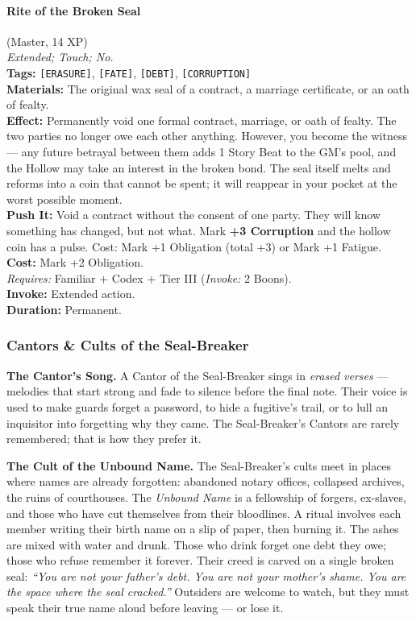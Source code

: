 \paragraph{Rite of the Broken Seal} (Master, 14 XP) \hfill \\
\emph{Extended; Touch; No.} \\
\textbf{Tags:} \texttt{[ERASURE]}, \texttt{[FATE]}, \texttt{[DEBT]}, \texttt{[CORRUPTION]} \\
\textbf{Materials:} The original wax seal of a contract, a marriage certificate, or an oath of fealty. \\
\textbf{Effect:} Permanently void one formal contract, marriage, or oath of fealty. The two parties no longer owe each other anything. However, you become the witness --- any future betrayal between them adds 1 Story Beat to the GM's pool, and the Hollow may take an interest in the broken bond. The seal itself melts and reforms into a coin that cannot be spent; it will reappear in your pocket at the worst possible moment. \\
\textbf{Push It:} Void a contract without the consent of one party. They will know something has changed, but not what. Mark \textbf{+3 Corruption} and the hollow coin has a pulse. Cost: Mark +1 Obligation (total +3) or Mark +1 Fatigue. \\
\textbf{Cost:} Mark +2 Obligation. \\
\textit{Requires:} Familiar + Codex + Tier III (\textit{Invoke:} 2 Boons). \\
\textbf{Invoke:} Extended action. \\
\textbf{Duration:} Permanent.

\subsubsection*{Cantors \& Cults of the Seal-Breaker}

\textbf{The Cantor's Song.} A Cantor of the Seal-Breaker sings in \textit{erased verses} --- melodies that start strong and fade to silence before the final note. Their voice is used to make guards forget a password, to hide a fugitive's trail, or to lull an inquisitor into forgetting why they came. The Seal-Breaker's Cantors are rarely remembered; that is how they prefer it.

\textbf{The Cult of the Unbound Name.} The Seal-Breaker's cults meet in places where names are already forgotten: abandoned notary offices, collapsed archives, the ruins of courthouses. The \textit{Unbound Name} is a fellowship of forgers, ex-slaves, and those who have cut themselves from their bloodlines. A ritual involves each member writing their birth name on a slip of paper, then burning it. The ashes are mixed with water and drunk. Those who drink forget one debt they owe; those who refuse remember it forever. Their creed is carved on a single broken seal: \textit{``You are not your father's debt. You are not your mother's shame. You are the space where the seal cracked.''} Outsiders are welcome to watch, but they must speak their true name aloud before leaving --- or lose it.

